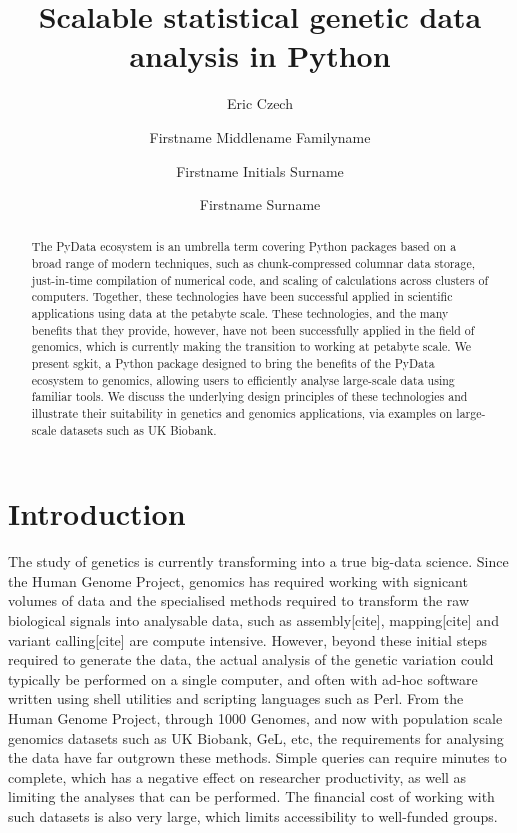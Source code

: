 \documentclass[9pt,lineno]{elife}
\title{Scalable statistical genetic data analysis in Python}
\author[1]{Eric Czech}
\author[1,2\authfn{1}\authfn{3}]{Firstname Middlename Familyname}
\author[2\authfn{1}\authfn{4}]{Firstname Initials Surname}
\author[2*]{Firstname Surname}
\affil[1]{Related Sciences LLC}
\affil[2]{Institution 2}
\begin{document}
\maketitle


\begin{abstract}
The PyData ecosystem is an umbrella term covering Python packages based on a
broad range of modern techniques, such as chunk-compressed columnar data
storage, just-in-time compilation of numerical code, and scaling of
calculations across clusters of computers. Together, these technologies have
been successful applied in scientific applications using data at the petabyte
scale. These technologies, and the many benefits that they provide, however,
have not been successfully applied in the field of genomics, which is currently
making the transition to working at petabyte scale. We present sgkit, a Python
package designed to bring the benefits of the PyData ecosystem to genomics,
allowing users to efficiently analyse large-scale data using familiar tools. We
discuss the underlying design principles of these technologies and illustrate
their suitability in genetics and genomics applications, via examples on
large-scale datasets such as UK Biobank.
\end{abstract}


\section{Introduction}


The study of genetics is currently transforming into a true big-data science.
Since the Human Genome Project, genomics has required working with
signicant volumes of data and the specialised methods
required to transform the raw biological signals into analysable data,
such as assembly[cite], mapping[cite] and variant calling[cite] are compute intensive.
However, beyond these initial steps required to generate the data, the actual
analysis of the genetic variation could typically be performed on a single
computer, and often with ad-hoc software written using shell utilities
and scripting languages such as Perl.
From the Human Genome Project, through 1000 Genomes, and now with
population scale genomics datasets such as UK Biobank, GeL, etc,
the requirements for analysing the data have far outgrown these
methods. Simple queries can require minutes to complete, which
has a negative effect on researcher productivity, as well as limiting
the analyses that can be performed. The financial cost of working
with such datasets is also very large, which limits accessibility
to well-funded groups.
\end{document}

